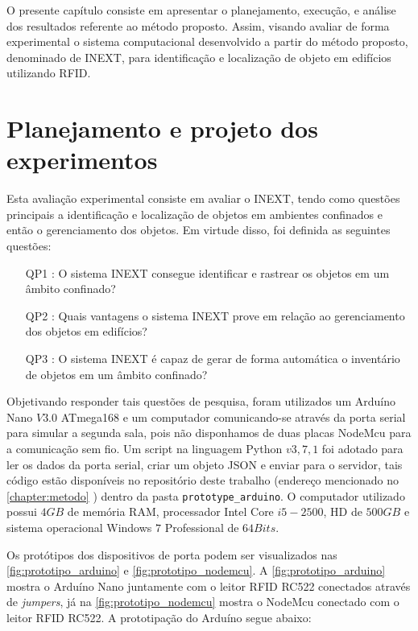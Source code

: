 \label{chapter:resultados}

O presente capítulo consiste em apresentar o planejamento, execução, e  análise dos resultados referente ao método proposto. Assim,  visando avaliar de forma experimental o sistema computacional desenvolvido a partir do método proposto, denominado de INEXT, para identificação e localização de objeto em edifícios utilizando RFID.

\section{Planejamento e projeto dos experimentos}

Esta avaliação experimental consiste em avaliar o INEXT, tendo como questões principais a identificação e localização de objetos em ambientes confinados e então o gerenciamento dos objetos. Em virtude disso, foi definida as seguintes questões:

\begin{itemize}

    \item[QP1]: O sistema INEXT consegue identificar e rastrear os objetos em um âmbito confinado?
    \item[QP2]: Quais vantagens o sistema INEXT prove em relação ao gerenciamento dos objetos em edifícios?
    \item[QP3]: O sistema INEXT é capaz de gerar de forma automática o inventário de objetos em um âmbito confinado?
    
\end{itemize}

\par 
Objetivando responder tais questões de pesquisa, foram utilizados um Arduíno Nano $V3.0$ ATmega168  e um computador comunicando-se através da porta serial para simular a segunda sala, pois não disponhamos de duas placas NodeMcu para a comunicação sem fio. Um script na linguagem Python $v 3,7,1$  foi adotado para ler os dados da porta serial, criar um objeto JSON e enviar para o servidor, tais código estão disponíveis no repositório deste trabalho (endereço mencionado no \autoref{chapter:metodo} ) dentro da pasta \texttt{prototype\_arduino}. O computador utilizado possui $4GB$ de memória RAM, processador Intel Core $i5-2500$, HD de $500GB$ e sistema operacional Windows $7$ Professional de $64Bits$. 

Os protótipos dos dispositivos de porta podem ser visualizados nas \autoref{fig:prototipo_arduino} e \autoref{fig:prototipo_nodemcu}. A \autoref{fig:prototipo_arduino} mostra o Arduíno Nano juntamente com o leitor RFID RC522 conectados através de \textit{jumpers}, já na \autoref{fig:prototipo_nodemcu} mostra o NodeMcu conectado com o leitor RFID RC522. A prototipação do Arduíno segue abaixo:


